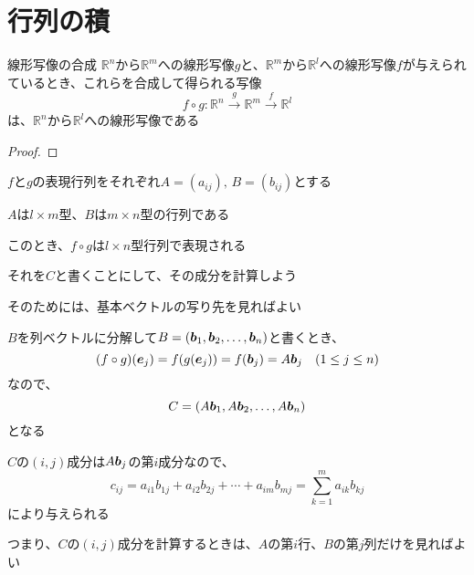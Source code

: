 \documentclass[../../../topic_linear-algebra]{subfiles}
\begin{document}
\sectionline
\section{行列の積}

\begin{theorem}{線形写像の合成}
  $\mathbb{R}^n$から$\mathbb{R}^m$への線形写像$g$と、$\mathbb{R}^m$から$\mathbb{R}^l$への線形写像$f$が与えられているとき、これらを合成して得られる写像
  \begin{equation*}
    f \circ g\colon \mathbb{R}^n \xrightarrow{g} \mathbb{R}^m \xrightarrow{f} \mathbb{R}^l
  \end{equation*}
  は、$\mathbb{R}^n$から$\mathbb{R}^l$への線形写像である
\end{theorem}

\begin{proof}
\end{proof}

$f$と$g$の表現行列をそれぞれ$A = (a_{ij}), \, B = (b_{ij})$とする

$A$は$l \times m$型、$B$は$m \times n$型の行列である

\br

このとき、$f \circ g$は$l \times n$型行列で表現される

それを$C$と書くことにして、その成分を計算しよう

そのためには、基本ベクトルの写り先を見ればよい

\br

$B$を列ベクトルに分解して$B = (\vb*{b}_1, \vb*{b}_2, \dots, \vb*{b}_n)$と書くとき、
\begin{equation*}
  (f \circ g)(\vb*{e}_j) = f(g(\vb*{e}_j)) = f(\vb*{b}_j) = A \vb*{b}_j \quad (1 \leq j \leq n)
\end{equation*}
なので、
\begin{equation*}
  C = (A\vb*{b}_1, A\vb*{b}_2, \dots, A\vb*{b}_n)
\end{equation*}
となる

$C$の$(i, j)$成分は$A\vb*{b}_j$の第$i$成分なので、
\begin{equation*}
  c_{ij} = a_{i1} b_{1j} + a_{i2} b_{2j} + \cdots + a_{im} b_{mj} = \sum_{k=1}^m a_{ik} b_{kj}
\end{equation*}
により与えられる

つまり、$C$の$(i, j)$成分を計算するときは、$A$の第$i$行、$B$の第$j$列だけを見ればよい
\end{document}
